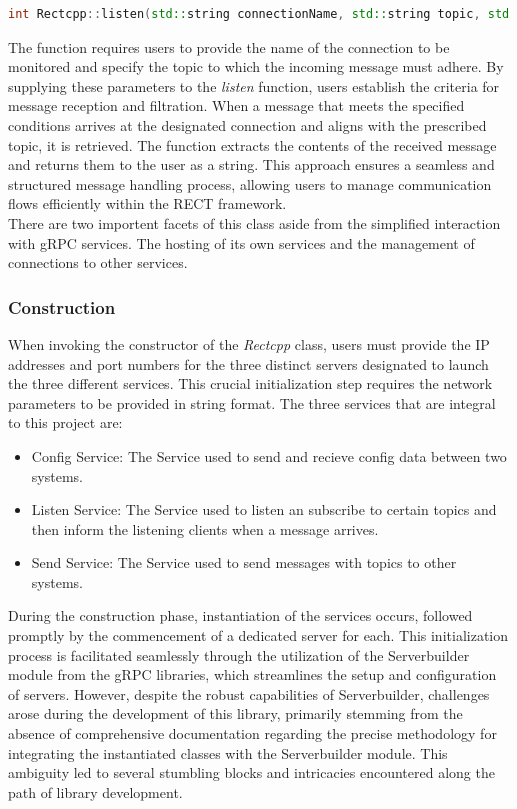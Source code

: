 \begin{lstlisting}[language=c++]
  int Rectcpp::listen(std::string connectionName, std::string topic, std::string& returning);
\end{lstlisting}

The function requires users to provide the name of the connection to be monitored and specify the topic to which the incoming message must adhere. By supplying 
these parameters to the \textit{listen} function, users establish the criteria for message reception and filtration. When a message that meets the specified conditions 
arrives at the designated connection and aligns with the prescribed topic, it is retrieved. The function extracts the contents of the received message and 
returns them to the user as a string. This approach ensures a seamless and structured message handling process, allowing users to manage communication flows 
efficiently within the RECT framework.\\

There are two importent facets of this class aside from the simplified interaction with gRPC services. The hosting of its own services and the management of
connections to other services.

\subsubsection{Construction}
When invoking the constructor of the \textit{Rectcpp} class, users must provide the IP addresses and port numbers for the three distinct servers designated to launch the 
three different services. This crucial initialization step requires the network parameters to be provided in string format. The three services that are integral 
to this project are:  

\begin{itemize}
  \item{Config Service:} The Service used to send and recieve config data between two systems.
  \item{Listen Service:} The Service used to listen an subscribe to certain topics and then inform the listening clients when a message arrives.
  \item{Send Service:} The Service used to send messages with topics to other systems.
\end{itemize}

During the construction phase, instantiation of the services occurs, followed promptly by the commencement of a dedicated server for each. This initialization 
process is facilitated seamlessly through the utilization of the Serverbuilder module from the gRPC libraries, which streamlines the setup and configuration of 
servers. However, despite the robust capabilities of Serverbuilder, challenges arose during the development of this library, primarily stemming from the absence 
of comprehensive documentation regarding the precise methodology for integrating the instantiated classes with the Serverbuilder module. This ambiguity led to 
several stumbling blocks and intricacies encountered along the path of library development.

